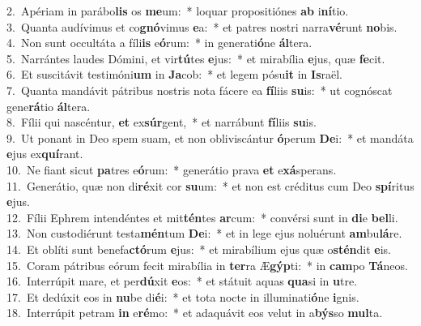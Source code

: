 {2.~}Apériam in parábo\textbf{lis} os \textbf{me}um:~* loquar propositiónes \textbf{ab} i\textbf{ní}tio.\\
{3.~}Quanta audívimus et co\textbf{gnó}vimus \textbf{e}a:~* et patres nostri narra\textbf{vé}runt \textbf{no}bis.\\
{4.~}Non sunt occultáta a fíli\textbf{is} e\textbf{ó}rum:~* in generati\textbf{ó}ne \textbf{ál}tera.\\
{5.~}Narrántes laudes Dómini, et vir\textbf{tú}tes \textbf{e}jus:~* et mirabília \textbf{e}jus, quæ \textbf{fe}cit.\\
{6.~}Et suscitávit testimóni\textbf{um} in \textbf{Ja}cob:~* et legem pósu\textbf{it} in \textbf{Is}raël.\\
{7.~}Quanta mandávit pátribus nostris nota fácere ea \textbf{fí}liis \textbf{su}is:~* ut cognóscat gene\textbf{rá}tio \textbf{ál}tera.\\
{8.~}Fílii qui nascéntur, \textbf{et} ex\textbf{súr}gent,~* et narrábunt \textbf{fí}liis \textbf{su}is.\\
{9.~}Ut ponant in Deo spem suam, et non obliviscántur \textbf{ó}perum \textbf{De}i:~* et mandáta \textbf{e}jus ex\textbf{quí}rant.\\
{10.~}Ne fiant sicut \textbf{pa}tres e\textbf{ó}rum:~* generátio prava \textbf{et} e\textbf{xá}sperans.\\
{11.~}Generátio, quæ non di\textbf{ré}xit cor \textbf{su}um:~* et non est créditus cum Deo \textbf{spí}ritus \textbf{e}jus.\\
{12.~}Fílii Ephrem intendéntes et mit\textbf{tén}tes \textbf{ar}cum:~* convérsi sunt in \textbf{di}e \textbf{bel}li.\\
{13.~}Non custodiérunt testa\textbf{mén}tum \textbf{De}i:~* et in lege ejus noluérunt \textbf{am}bu\textbf{lá}re.\\
{14.~}Et oblíti sunt benefa\textbf{ctó}rum \textbf{e}jus:~* et mirabílium ejus quæ o\textbf{stén}dit \textbf{e}is.\\
{15.~}Coram pátribus eórum fecit mirabília in \textbf{ter}ra Æ\textbf{gýp}ti:~* in \textbf{cam}po \textbf{Tá}neos.\\
{16.~}Interrúpit mare, et per\textbf{dú}xit \textbf{e}os:~* et státuit aquas \textbf{qua}si in \textbf{u}tre.\\
{17.~}Et dedúxit eos in \textbf{nu}be di\textbf{é}i:~* et tota nocte in illuminati\textbf{ó}ne \textbf{i}gnis.\\
{18.~}Interrúpit petram \textbf{in} e\textbf{ré}mo:~* et adaquávit eos velut in a\textbf{býs}so \textbf{mul}ta.\\
